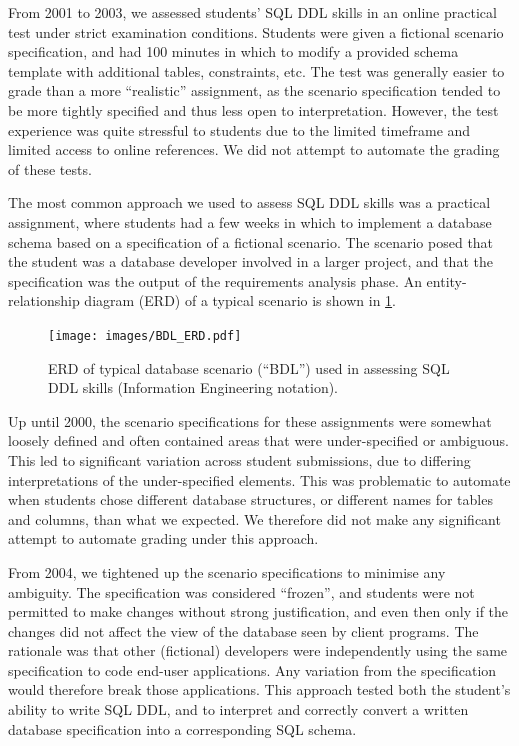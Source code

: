 \documentclass[sigconf, authordraft, capitalise]{acmart}
\begin{document}
From 2001 to 2003, we assessed students' SQL DDL skills in an online practical test under strict examination conditions. Students were given a fictional scenario specification, and had 100 minutes in which to modify a provided schema template with additional tables, constraints, etc. The test was generally easier to grade than a more ``realistic'' assignment, as the scenario specification tended to be more tightly specified and thus less open to interpretation. However, the test experience was quite stressful to students due to the limited timeframe and limited access to online references. We did not attempt to automate the grading of these tests.

The most common approach we used to assess SQL DDL skills was a practical assignment, where students had a few weeks in which to implement a database schema based on a specification of a fictional scenario. The scenario posed that the student was a database developer involved in a larger project, and that the specification was the output of the requirements analysis phase. An entity-relationship diagram (ERD) of a typical scenario is shown in \cref{fig-ERD}.
 
\begin{figure}[hb]
    \centering
    \texttt{[image: images/BDL\_ERD.pdf]} 
    \caption{ERD of typical database scenario (``BDL'') used in assessing SQL DDL skills (Information Engineering notation).}
    \label{fig-ERD}
\end{figure}

Up until 2000, the scenario specifications for these assignments were somewhat loosely defined and often contained areas that were under-specified or ambiguous. This led to significant variation across student submissions, due to differing interpretations of the under-specified elements. This was problematic to automate when students chose different database structures, or different names for tables and columns, than what we expected. We therefore did not make any significant attempt to automate grading under this approach.

From 2004, we tightened up the scenario specifications to minimise any ambiguity. The specification was considered ``frozen'', and students were not permitted to make changes without strong justification, and even then only if the changes did not affect the view of the database seen by client programs. The rationale was that other (fictional) developers were independently using the same specification to code end-user applications. Any variation from the specification would therefore break those applications. This approach tested both the student's ability to write SQL DDL, and to interpret and correctly convert a written database specification into a corresponding SQL schema.
\end{document}
